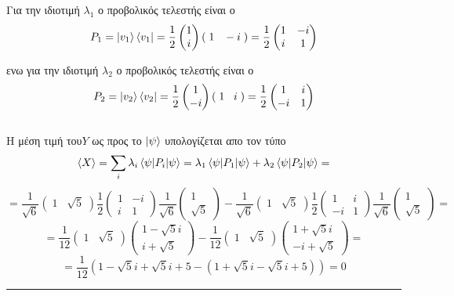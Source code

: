 \documentclass[12pt]{article}
\begin{document}
Για την ιδιοτιμή $\lambda_1$ ο προβολικός τελεστής είναι ο 
$$ P_1 = \ket{v_1}\bra{v_1} = \frac{1}{2}\begin{pmatrix}
    1\\i
\end{pmatrix}(\;1\;\;\;-i\;) = \frac{1}{2}\begin{pmatrix}
    1&-i\\i&1
\end{pmatrix}$$

ενω για την ιδιοτιμή $\lambda_2$ ο προβολικός τελεστής είναι ο
$$ P_2 = \ket{v_2}\bra{v_2} = \frac{1}{2}\begin{pmatrix}
    1\\-i
\end{pmatrix}(\;1\;\;\;i\;) = \frac{1}{2}\begin{pmatrix}
    1&i\\-i&1
\end{pmatrix}$$\\
Η μέση τιμή του$Y$ ως προς το $\ket{\psi}$ υπολογίζεται απο τον τύπο 
$$ \braket{X} = \sum_i \lambda_i\braket{\psi|P_i|\psi} = \lambda_1\braket{\psi|P_1|\psi} + \lambda_2\braket{\psi|P_2|\psi}=$$
$$= \frac{1}{\sqrt{6}}(\;1\;\;\;\sqrt{5}\;)\frac{1}{2}\begin{pmatrix}
    1&-i\\i&1
\end{pmatrix}\frac{1}{\sqrt{6}}\begin{pmatrix}1\\\sqrt{5}\end{pmatrix} - \frac{1}{\sqrt{6}}(\;1\;\;\;\sqrt{5}\;)\frac{1}{2}\begin{pmatrix}
    1&i\\-i&1
\end{pmatrix}\frac{1}{\sqrt{6}}\begin{pmatrix}1\\\sqrt{5}\end{pmatrix} =$$
$$=\frac{1}{12}(\;1\;\;\;\sqrt{5}\;)\begin{pmatrix}1-\sqrt{5}i\\i+\sqrt{5}\end{pmatrix} - 
\frac{1}{12}(\;1\;\;\;\sqrt{5}\;)\begin{pmatrix}1+\sqrt{5}i\\-i+\sqrt{5}\end{pmatrix} = $$
$$= \frac{1}{12}(1 - \sqrt{5}i+\sqrt{5}i+5 -(1 + \sqrt{5}i-\sqrt{5}i+5) ) = 0$$
\rule{\textwidth}{.5pt}
\end{document}
